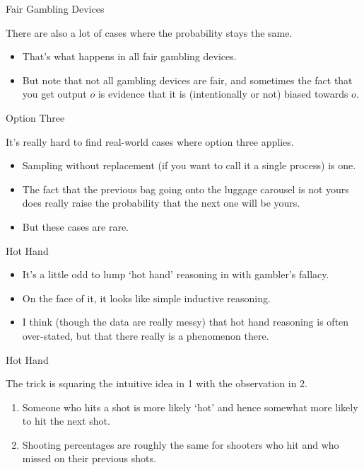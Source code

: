 \documentclass[
  ignorenonframetext,
]{beamer}
\providecommand{\tightlist}{%
  \setlength{\itemsep}{0pt}\setlength{\parskip}{0pt}}
\renewcommand{\,}{\text{, }}
\begin{document}
\begin{frame}{Fair Gambling Devices}
\protect\hypertarget{fair-gambling-devices}{}

There are also a lot of cases where the probability stays the same.

\begin{itemize}[<+->]
\tightlist
\item
  That's what happens in all fair gambling devices.
\item
  But note that not all gambling devices are fair, and sometimes the
  fact that you get output \(o\) is evidence that it is (intentionally
  or not) biased towards \(o\).
\end{itemize}

\end{frame}

\begin{frame}{Option Three}
\protect\hypertarget{option-three}{}

It's really hard to find real-world cases where option three applies.

\begin{itemize}[<+->]
\tightlist
\item
  Sampling without replacement (if you want to call it a single process)
  is one.
\item
  The fact that the previous bag going onto the luggage carousel is not
  yours does really raise the probability that the next one will be
  yours.
\item
  But these cases are rare.
\end{itemize}

\end{frame}

\begin{frame}{Hot Hand}
\protect\hypertarget{hot-hand}{}

\begin{itemize}
\tightlist
\item
  It's a little odd to lump `hot hand' reasoning in with gambler's
  fallacy.
\item
  On the face of it, it looks like simple inductive reasoning.
\item
  I think (though the data are really messy) that hot hand reasoning is
  often over-stated, but that there really is a phenomenon there.
\end{itemize}

\end{frame}

\begin{frame}{Hot Hand}
\protect\hypertarget{hot-hand-1}{}

The trick is squaring the intuitive idea in 1 with the observation in 2.

\begin{enumerate}
\tightlist
\item
  Someone who hits a shot is more likely `hot' and hence somewhat more
  likely to hit the next shot.
\item
  Shooting percentages are roughly the same for shooters who hit and who
  missed on their previous shots.
\end{enumerate}

\end{frame}
\end{document}
